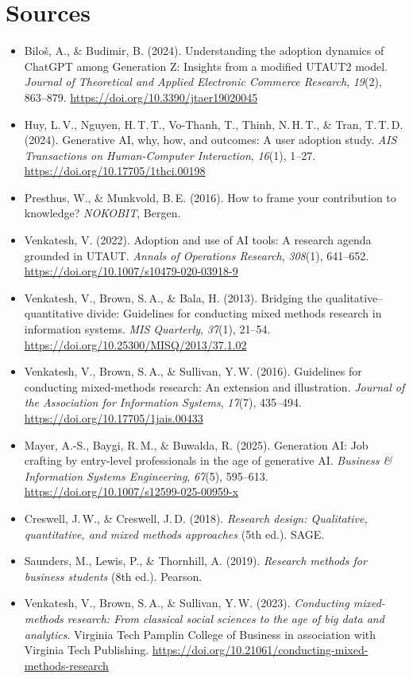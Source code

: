 \documentclass[11pt,a4paper,british,twoside=false,headings=small,chapterprefix=false,numbers=noenddot]{scrbook}
\begin{document}
\section*{Sources}
\begin{itemize}\small
  \item Bilo\v{s}, A., \& Budimir, B. (2024). Understanding the adoption dynamics of ChatGPT among Generation Z: Insights from a modified UTAUT2 model. \emph{Journal of Theoretical and Applied Electronic Commerce Research}, \emph{19}(2), 863--879. \url{https://doi.org/10.3390/jtaer19020045}
  \item Huy, L.\,V., Nguyen, H.\,T.\,T., Vo-Thanh, T., Thinh, N.\,H.\,T., \& Tran, T.\,T.\,D. (2024). Generative AI, why, how, and outcomes: A user adoption study. \emph{AIS Transactions on Human-Computer Interaction}, \emph{16}(1), 1--27. \url{https://doi.org/10.17705/1thci.00198}
  \item Presthus, W., \& Munkvold, B.\,E. (2016). How to frame your contribution to knowledge? \emph{NOKOBIT}, Bergen.
  \item Venkatesh, V. (2022). Adoption and use of AI tools: A research agenda grounded in UTAUT. \emph{Annals of Operations Research}, \emph{308}(1), 641--652. \url{https://doi.org/10.1007/s10479-020-03918-9}
  \item Venkatesh, V., Brown, S.\,A., \& Bala, H. (2013). Bridging the qualitative--quantitative divide: Guidelines for conducting mixed methods research in information systems. \emph{MIS Quarterly}, \emph{37}(1), 21--54. \url{https://doi.org/10.25300/MISQ/2013/37.1.02}
  \item Venkatesh, V., Brown, S.\,A., \& Sullivan, Y.\,W. (2016). Guidelines for conducting mixed-methods research: An extension and illustration. \emph{Journal of the Association for Information Systems}, \emph{17}(7), 435--494. \url{https://doi.org/10.17705/1jais.00433}
  \item Mayer, A.-S., Baygi, R.\,M., \& Buwalda, R. (2025). Generation AI: Job crafting by entry-level professionals in the age of generative AI. \emph{Business \& Information Systems Engineering}, \emph{67}(5), 595--613. \url{https://doi.org/10.1007/s12599-025-00959-x}
  \item Creswell, J.\,W., \& Creswell, J.\,D. (2018). \emph{Research design: Qualitative, quantitative, and mixed methods approaches} (5th ed.). SAGE.
  \item Saunders, M., Lewis, P., \& Thornhill, A. (2019). \emph{Research methods for business students} (8th ed.). Pearson.
  \item Venkatesh, V., Brown, S.\,A., \& Sullivan, Y.\,W. (2023). \emph{Conducting mixed-methods research: From classical social sciences to the age of big data and analytics}. Virginia Tech Pamplin College of Business in association with Virginia Tech Publishing. \url{https://doi.org/10.21061/conducting-mixed-methods-research}

\end{itemize}
\end{document}
